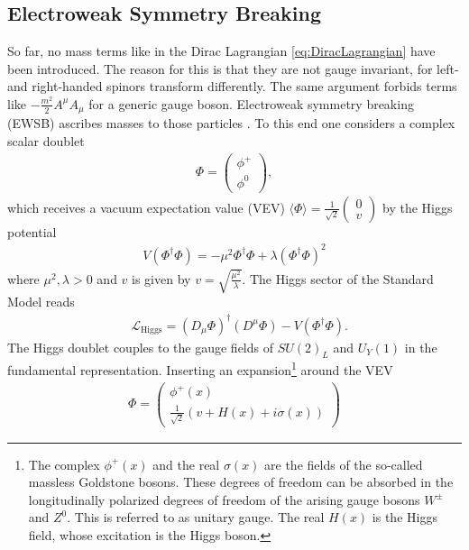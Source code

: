 \subsection{Electroweak Symmetry Breaking}\label{sec:EWSB}
So far, no mass terms like in the Dirac Lagrangian \eqref{eq:DiracLagrangian} have been introduced. The reason for this is that they are not gauge invariant, for left- and right-handed spinors transform differently. The same argument forbids terms like $-\frac{m^2}{2}A^\mu A_\mu$ for a generic gauge boson. Electroweak symmetry breaking (EWSB) ascribes masses to those particles \cite{Higgs:1964ia, Higgs:1964pj, Higgs:1966ev, Englert:1964et, Guralnik:1964eu, Kibble:1967sv, Bernstein:1974rd}. To this end one considers a complex scalar doublet
\begin{align}
\Phi = \begin{pmatrix}
\phi^+ \\ 
\phi^0
\end{pmatrix},
\end{align}
which receives a vacuum expectation value (VEV) $\langle \Phi \rangle = \frac{1}{\sqrt{2}}\begin{pmatrix}
0 \\ v
\end{pmatrix}$ by the Higgs potential
\begin{align}
V(\Phi^\dagger\Phi) = -\mu^2 \Phi^\dagger\Phi + \lambda (\Phi^\dagger\Phi)^2
\end{align}
where $\mu^2,\lambda > 0$ and $v$ is given by $v = \sqrt{\frac{\mu^2}{\lambda}}$.
The Higgs sector of the Standard Model reads
\begin{align}
&\mathcal{L}_{\mathrm{Higgs}} = (D_\mu \Phi)^\dagger (D^\mu \Phi) - V(\Phi^\dagger\Phi).
\end{align}
The Higgs doublet couples to the gauge fields of $SU(2)_L$ and $U_Y(1)$ in the fundamental representation. Inserting an expansion\footnote{The complex $\phi^+(x)$ and the real $\sigma(x)$ are the fields of the so-called massless Goldstone bosons. These degrees of freedom can be absorbed in the longitudinally polarized degrees of freedom of the arising gauge bosons $W^\pm$ and $Z^0$. This is referred to as unitary gauge\cite{book:811554}. The real $H(x)$ is the Higgs field, whose excitation is the Higgs boson.} around the VEV 
\begin{align}
\Phi = \begin{pmatrix}
\phi^+(x) \\
\frac{1}{\sqrt{2}} (v + H(x) + i\sigma(x))
\end{pmatrix}
\end{align}
